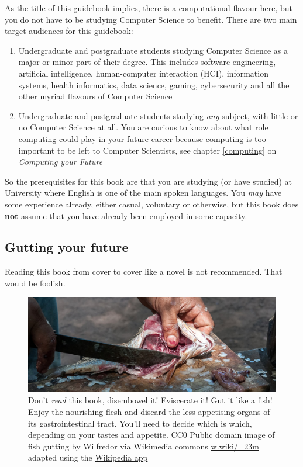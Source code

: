 \documentclass[
]{book}
\providecommand{\tightlist}{%
  \setlength{\itemsep}{0pt}\setlength{\parskip}{0pt}}
\begin{document}
As the title of this guidebook implies, there is a computational flavour here, but you do not have to be studying Computer Science to benefit. There are two main target audiences for this guidebook:

\begin{enumerate}
\def\labelenumi{\arabic{enumi}.}
\tightlist
\item
  Undergraduate and postgraduate students studying Computer Science as a major or minor part of their degree. This includes software engineering, artificial intelligence, human-computer interaction (HCI), information systems, health informatics, data science, gaming, cybersecurity and all the other myriad flavours of Computer Science
\item
  Undergraduate and postgraduate students studying \emph{any} subject, with little or no Computer Science at all. You are curious to know about what role computing could play in your future career because computing is too important to be left to Computer Scientists, see chapter \ref{computing} on \emph{Computing your Future}
\end{enumerate}

So the prerequisites for this book are that you are studying (or have studied) at University where English is one of the main spoken languages. You \emph{may} have some experience already, either casual, voluntary or otherwise, but this book does \textbf{not} assume that you have already been employed in some capacity.

\hypertarget{gut}{%
\subsection{Gutting your future}\label{gut}}

Reading this book from cover to cover like a novel is not recommended. That would be foolish.

\begin{figure}

{\centering \includegraphics[width=1\linewidth]{images/fish-gutting} 

}

\caption{Don't \emph{read} this book, \href{https://en.wikipedia.org/wiki/Disembowelment}{disembowel it}! Eviscerate it! Gut it like a fish! Enjoy the nourishing flesh and discard the less appetising organs of its gastrointestinal tract. You'll need to decide which is which, depending on your tastes and appetite. CC0 Public domain image of fish gutting by Wilfredor via Wikimedia commons \href{https://w.wiki/_23m}{w.wiki/\_23m} adapted using the \href{https://apps.apple.com/gb/app/wikipedia/id324715238}{Wikipedia app}}\label{fig:gut-fig}
\end{figure}
\end{document}
